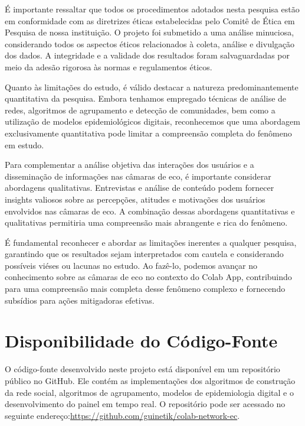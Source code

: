 É importante ressaltar que todos os procedimentos adotados nesta pesquisa estão em conformidade com as diretrizes éticas estabelecidas pelo Comitê de Ética em Pesquisa de nossa instituição. O projeto foi submetido a uma análise minuciosa, considerando todos os aspectos éticos relacionados à coleta, análise e divulgação dos dados. A integridade e a validade dos resultados foram salvaguardadas por meio da adesão rigorosa às normas e regulamentos éticos.

Quanto às limitações do estudo, é válido destacar a natureza predominantemente quantitativa da pesquisa. Embora tenhamos empregado técnicas de análise de redes, algoritmos de agrupamento e detecção de comunidades, bem como a utilização de modelos epidemiológicos digitais, reconhecemos que uma abordagem exclusivamente quantitativa pode limitar a compreensão completa do fenômeno em estudo.

Para complementar a análise objetiva das interações dos usuários e a disseminação de informações nas câmaras de eco, é importante considerar abordagens qualitativas. Entrevistas e análise de conteúdo podem fornecer insights valiosos sobre as percepções, atitudes e motivações dos usuários envolvidos nas câmaras de eco. A combinação dessas abordagens quantitativas e qualitativas permitiria uma compreensão mais abrangente e rica do fenômeno.

É fundamental reconhecer e abordar as limitações inerentes a qualquer pesquisa, garantindo que os resultados sejam interpretados com cautela e considerando possíveis viéses ou lacunas no estudo. Ao fazê-lo, podemos avançar no conhecimento sobre as câmaras de eco no contexto do Colab App, contribuindo para uma compreensão mais completa desse fenômeno complexo e fornecendo subsídios para ações mitigadoras efetivas.

\section{Disponibilidade do Código-Fonte}
O código-fonte desenvolvido neste projeto está disponível em um repositório público no GitHub. Ele contém as implementações dos algoritmos de construção da rede social, algoritmos de agrupamento, modelos de epidemiologia digital e o desenvolvimento do painel em tempo real. O repositório pode ser acessado no seguinte endereço:\url{https://github.com/guinetik/colab-network-ec}.